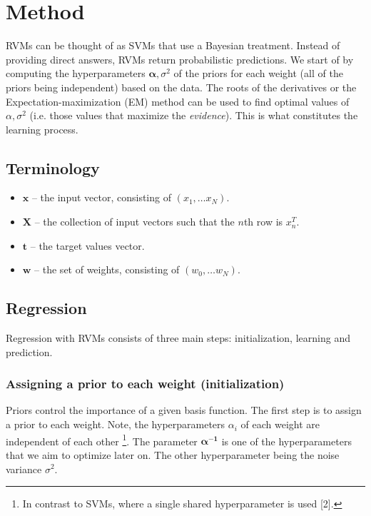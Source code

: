 \section{Method}
RVMs can be thought of as SVMs that use a Bayesian treatment. Instead of providing direct answers, RVMs return probabilistic predictions. We start of by computing the hyperparameters $\boldsymbol{\alpha},\sigma^2$ of the priors for each weight (all of the priors being independent) based on the data. The roots of the derivatives or the Expectation-maximization (EM) method can be used to find optimal values of $\alpha,\sigma^2$ (i.e. those values that maximize the \textit{evidence}). This is what constitutes the learning process. %


\subsection{Terminology}
\begin{itemize}
	\item $\boldsymbol{x}$ -- the input vector, consisting of $(x_1,\dots x_N)$.
	\item $\boldsymbol{X}$ -- the collection of input vectors such that the $n$th row is $x_n^T$.
	\item $\boldsymbol{t}$ -- the target values vector.
	\item $\boldsymbol{w}$ -- the set of weights, consisting of $(w_0,\dots w_N)$.
\end{itemize}

\subsection{Regression}
Regression with RVMs consists of three main steps: initialization, learning and prediction.
\subsubsection{Assigning a prior to each weight (initialization)} Priors control the importance of a given basis function. The first step is to assign a prior to each weight. Note, the hyperparameters $\alpha_i$ of each weight are independent of each other \footnote{In contrast to SVMs, where a single shared hyperparameter is used [2].}. The parameter $\boldsymbol{\alpha^{-1}}$ is one of the hyperparameters that we aim to optimize later on. The other hyperparameter being the noise variance $\sigma^2$.

